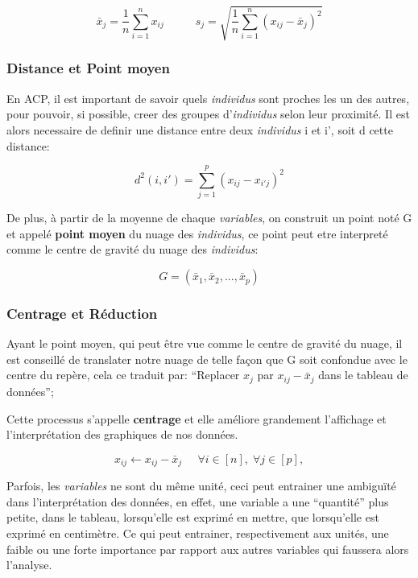 \documentclass{article}
\begin{document}
\begin{equation*}
\bar{x}_j=\frac{1}{n}\sum_{i=1}^{n}{x_{ij}} \;\;\;\;\;\;\;\;\;\; s_j=\sqrt{\frac{1}{n}\sum_{i=1}^{n}{(x_{ij}-\bar{x}_j)^2}}
\end{equation*}

\subsubsection{Distance et Point moyen}
En ACP, il est important de savoir quels \textit{individus} sont proches les un des autres, pour pouvoir, si possible, creer des groupes d'\textit{individus} selon leur proximité. Il est alors necessaire de definir une distance entre deux \textit{individus} i et i', soit d cette distance:

\begin{equation*}
d^2(i,i')=\sum_{j=1}^{p}{(x_{ij}-x_{i'j})^2} 
\end{equation*}

\newpage

De plus, à partir de la moyenne de chaque \textit{variables}, on construit un point noté G et appelé \textbf{point moyen} du nuage des \textit{individus}, ce point peut etre interpreté comme le centre de gravité du nuage des \textit{individus}:

\begin{equation*}
G=(\bar{x}_1,\bar{x}_2,...,\bar{x}_p)
\end{equation*}

\subsubsection{Centrage et Réduction}
Ayant le point moyen, qui peut être vue comme le centre de gravité du nuage, il est conseillé de translater notre nuage de telle façon que G soit confondue avec le centre du repère, cela ce traduit par: ``Replacer $x_j$ par $x_{ij}-\bar{x}_j$ dans le tableau de données'';
\newline

Cette processus s'appelle \textbf{centrage} et elle améliore grandement l'affichage et l'interprétation des graphiques de nos données.

\begin{equation*}
x_{ij} \leftarrow x_{ij}-\bar{x}_j \;\;\;\;\; \forall i \in [n], \; \forall j \in [p],
\end{equation*}
\newline

Parfois, les \textit{variables} ne sont du même unité, ceci peut entrainer une ambiguïté dans l'interprétation des données, en effet, une variable a une ``quantité'' plus petite, dans le tableau, lorsqu'elle est exprimé en mettre, que lorsqu'elle est exprimé en centimètre. Ce qui peut entrainer, respectivement aux unités, une faible ou une forte importance par rapport aux autres variables qui faussera alors l'analyse.
\newline
\end{document}
